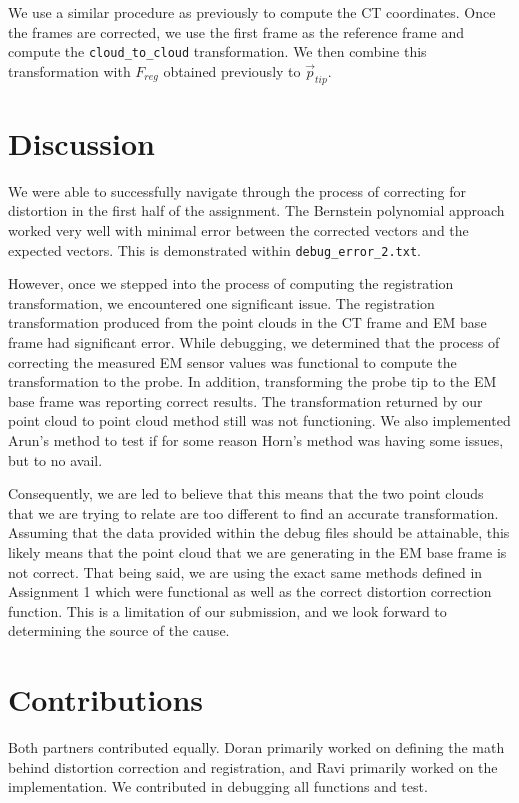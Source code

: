 \documentclass[letterpaper, 11pt]{report}
\begin{document}
We use a similar procedure as previously to compute the CT coordinates. Once the frames are corrected, we use the first frame as the reference frame and compute the \texttt{cloud\_to\_cloud} transformation. We then combine this transformation with $F_{reg}$ obtained previously to $\vec p_{tip}$.

\section{Discussion} 
We were able to successfully navigate through the process of correcting for distortion in the first half of the assignment. The Bernstein polynomial approach worked very well with minimal error between the corrected vectors and the expected vectors. This is demonstrated within \texttt{debug\_error\_2.txt}. 

However, once we stepped into the process of computing the registration transformation, we encountered one significant issue. The registration transformation produced from the point clouds in the CT frame and EM base frame had significant error. While debugging, we determined that the process of correcting the measured EM sensor values was functional to compute the transformation to the probe. In addition, transforming the probe tip to the EM base frame was reporting correct results. The transformation returned by our point cloud to point cloud method still was not functioning. We also implemented Arun's method to test if for some reason Horn's method was having some issues, but to no avail.

Consequently, we are led to believe that this means that the two point clouds that we are trying to relate are too different to find an accurate transformation. Assuming that the data provided within the debug files should be attainable, this likely means that the point cloud that we are generating in the EM base frame is not correct. That being said, we are using the exact same methods defined in Assignment 1 which were functional as well as the correct distortion correction function. This is a limitation of our submission, and we look forward to determining the source of the cause.

\section{Contributions}
Both partners contributed equally. Doran primarily worked on defining the math behind distortion correction and registration, and Ravi primarily worked on the implementation. We contributed in debugging all functions and test.
\end{document}
